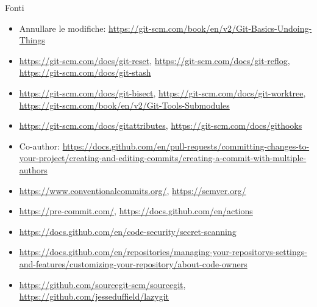 \documentclass[aspectratio=169,handout,10pt]{beamer}
\begin{document}
\begin{frame}{Fonti}
    \footnotesize
    \begin{itemize}
        \item Annullare le modifiche: \url{https://git-scm.com/book/en/v2/Git-Basics-Undoing-Things}
        \item \url{https://git-scm.com/docs/git-reset}, \url{https://git-scm.com/docs/git-reflog}, \url{https://git-scm.com/docs/git-stash}
        \item \url{https://git-scm.com/docs/git-bisect}, \url{https://git-scm.com/docs/git-worktree}, \url{https://git-scm.com/book/en/v2/Git-Tools-Submodules}
        \item \url{https://git-scm.com/docs/gitattributes}, \url{https://git-scm.com/docs/githooks}
        \item Co-author: \url{https://docs.github.com/en/pull-requests/committing-changes-to-your-project/creating-and-editing-commits/creating-a-commit-with-multiple-authors}
        \item \url{https://www.conventionalcommits.org/}, \url{https://semver.org/}
        \item \url{https://pre-commit.com/}, \url{https://docs.github.com/en/actions}
        \item \url{https://docs.github.com/en/code-security/secret-scanning}
        \item \url{https://docs.github.com/en/repositories/managing-your-repositorys-settings-and-features/customizing-your-repository/about-code-owners}
        \item \url{https://github.com/sourcegit-scm/sourcegit}, \url{https://github.com/jesseduffield/lazygit}
    \end{itemize}
\end{frame}
\end{document}

